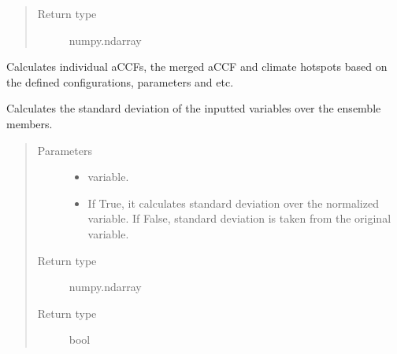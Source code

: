 \documentclass[a4paper,11pt,english]{sphinxmanual}
\begin{document}
\begin{fulllineitems}
\begin{fulllineitems}
\begin{quote}
\begin{description}
\item[{Return type}] \leavevmode
numpy.ndarray

\end{description}\end{quote}

\end{fulllineitems}


\begin{fulllineitems}
\label{\detokenize{modules:envlib.accf.GeTaCCFs.get_accfs}}
Calculates individual aCCFs, the merged aCCF and climate hotspots based on the defined configurations, parameters and etc.

\end{fulllineitems}


\begin{fulllineitems}
\label{\detokenize{modules:envlib.accf.GeTaCCFs.get_std}}
Calculates the standard deviation of the inputted variables over the ensemble members.
\begin{quote}\begin{description}
\item[{Parameters}] \leavevmode\begin{itemize}
\item {} 
 \textendash{} variable.

\item {} 
 \textendash{} If True, it calculates standard deviation over the normalized variable. If False, standard deviation is taken from the original variable.

\end{itemize}

\item[{Return type}] \leavevmode
numpy.ndarray

\item[{Return type}] \leavevmode
bool


\end{description}
\end{quote}
\end{fulllineitems}
\end{fulllineitems}
\end{document}
